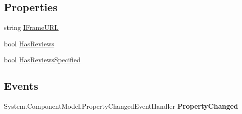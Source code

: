 \subsection*{Properties}
\begin{DoxyCompactItemize}
\item 
\hypertarget{class_price___comparison_1_1amazon_1_1ecs_1_1_customer_reviews_a44859411a960cfc8f5c2b384000eafca}{string \hyperlink{class_price___comparison_1_1amazon_1_1ecs_1_1_customer_reviews_a44859411a960cfc8f5c2b384000eafca}{I\-Frame\-U\-R\-L}}\label{class_price___comparison_1_1amazon_1_1ecs_1_1_customer_reviews_a44859411a960cfc8f5c2b384000eafca}

\begin{DoxyCompactList}\small\item\em \end{DoxyCompactList}\item 
\hypertarget{class_price___comparison_1_1amazon_1_1ecs_1_1_customer_reviews_a7aeb2dddd1ff0ef305b88507505cb6f0}{bool \hyperlink{class_price___comparison_1_1amazon_1_1ecs_1_1_customer_reviews_a7aeb2dddd1ff0ef305b88507505cb6f0}{Has\-Reviews}}\label{class_price___comparison_1_1amazon_1_1ecs_1_1_customer_reviews_a7aeb2dddd1ff0ef305b88507505cb6f0}

\begin{DoxyCompactList}\small\item\em \end{DoxyCompactList}\item 
\hypertarget{class_price___comparison_1_1amazon_1_1ecs_1_1_customer_reviews_abc33b0ea379e675c5a37dd5240ff05e9}{bool \hyperlink{class_price___comparison_1_1amazon_1_1ecs_1_1_customer_reviews_abc33b0ea379e675c5a37dd5240ff05e9}{Has\-Reviews\-Specified}}\label{class_price___comparison_1_1amazon_1_1ecs_1_1_customer_reviews_abc33b0ea379e675c5a37dd5240ff05e9}

\begin{DoxyCompactList}\small\item\em \end{DoxyCompactList}\end{DoxyCompactItemize}
\subsection*{Events}
\begin{DoxyCompactItemize}
\item 
\hypertarget{class_price___comparison_1_1amazon_1_1ecs_1_1_customer_reviews_add897376f852905062903d7aeb739d8a}{System.\-Component\-Model.\-Property\-Changed\-Event\-Handler {\bfseries Property\-Changed}}\label{class_price___comparison_1_1amazon_1_1ecs_1_1_customer_reviews_add897376f852905062903d7aeb739d8a}

\end{DoxyCompactItemize}
